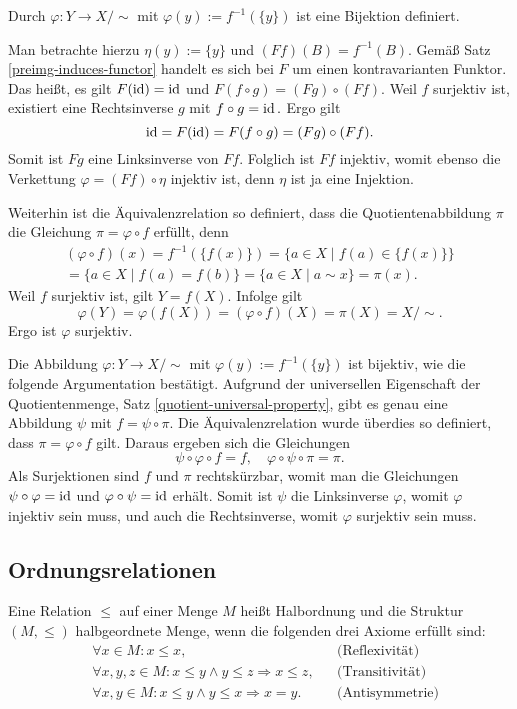\newpage
\begin{Beweis}[Beweis 2]
Durch $\varphi\colon Y\to X/{\sim}$ mit $\varphi(y):=f^{-1}(\{y\})$ ist
eine Bijektion definiert.

Man betrachte hierzu $\eta(y):=\{y\}$ und $(Ff)(B) = f^{-1}(B).$
Gemäß Satz \ref{preimg-induces-functor} handelt es sich bei $F$ um einen
kontravarianten Funktor. Das heißt, es gilt
$F(\operatorname{id})=\operatorname{id}$ und $F(f\circ g) = (Fg)\circ (Ff).$ Weil $f$ surjektiv ist,
existiert eine Rechtsinverse $g$ mit $f\circ g = \operatorname{id}.$ Ergo gilt
\[\operatorname{id} = F(\operatorname{id}) = F(f\circ g) = (Fg)\circ (Ff).\]
Somit ist $Fg$ eine Linksinverse von $Ff.$ Folglich ist $Ff$ injektiv,
womit ebenso die Verkettung $\varphi = (Ff)\circ \eta$ injektiv ist,
denn $\eta$ ist ja eine Injektion.

Weiterhin ist die Äquivalenzrelation so definiert, dass die
Quotientenabbildung $\pi$ die Gleichung $\pi=\varphi\circ f$ erfüllt, denn
\begin{gather*}
(\varphi\circ f)(x) = f^{-1}(\{f(x)\}) = \{a\in X\mid f(a)\in \{f(x)\}\}\\
= \{a\in X\mid f(a)=f(b)\} = \{a\in X\mid a\sim x\} = \pi(x).
\end{gather*}
Weil $f$ surjektiv ist, gilt $Y=f(X).$ Infolge gilt
\[\varphi(Y) = \varphi(f(X)) = (\varphi\circ f)(X) = \pi(X) = X/{\sim}.\]
Ergo ist $\varphi$ surjektiv.\,\qedsymbol
\end{Beweis}
\begin{Beweis}[Beweis 3]
Die Abbildung $\varphi\colon Y\to X/{\sim}$ mit $\varphi(y):=f^{-1}(\{y\})$
ist bijektiv, wie die folgende Argumentation bestätigt.
Aufgrund der universellen Eigenschaft der Quotientenmenge, Satz
\ref{quotient-universal-property}, gibt es
genau eine Abbildung $\psi$ mit $f = \psi\circ\pi$. Die
Äquivalenzrelation wurde überdies so definiert, dass
$\pi = \varphi\circ f$ gilt. Daraus ergeben sich die Gleichungen
\[\psi\circ\varphi\circ f = f,\quad \varphi\circ\psi\circ\pi = \pi.\]
Als Surjektionen sind $f$ und $\pi$ rechtskürzbar, womit man
die Gleichungen $\psi\circ\varphi = \operatorname{id}$ und $\varphi\circ\psi = \operatorname{id}$
erhält. Somit ist $\psi$ die Linksinverse $\varphi$, womit
$\varphi$ injektiv sein muss, und auch die Rechtsinverse, womit
$\varphi$ surjektiv sein muss.\,\qedsymbol
\end{Beweis}

\subsection{Ordnungsrelationen}
\begin{Definition}[Halbordnung]\newlinefirst
Eine Relation $\le$ auf einer Menge $M$ heißt Halbordnung
und die Struktur $(M,\le)$ halbgeordnete Menge,
wenn die folgenden drei Axiome erfüllt sind:
\begin{align*}
&\forall x\in M\colon x\le x, &&\text{(Reflexivität)}\\
&\forall x,y,z\in M\colon x\le y\land y\le z\Rightarrow x\le z, &&\text{(Transitivität)}\\
&\forall x,y\in M\colon x\le y\land y\le x\Rightarrow x=y. &&\text{(Antisymmetrie)}
\end{align*}
\end{Definition}

